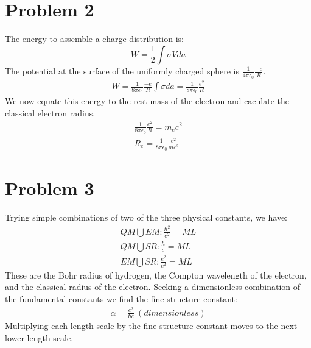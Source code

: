 \documentclass[a4paper,10pt]{article}
\numberwithin{equation}{section}
\begin{document}
\section{Problem 2}
The energy to assemble a charge distribution is:
\begin{equation}
 W=\frac{1}{2} \int \sigma V da
\end{equation}
The potential at the surface of the uniformly charged sphere is $\frac{1}{4\pi \epsilon_0}\frac{-e}{R}$.
\begin{gather}
 W=\frac{1}{8\pi \epsilon_0}\frac{-e}{R}\int \sigma da= \frac{1}{8\pi \epsilon_0}\frac{e^2}{R}
\end{gather}
We now equate this energy to the rest mass of the electron and caculate the classical electron radius.
\begin{gather}
  \frac{1}{8\pi \epsilon_0}\frac{e^2}{R}=m_ec^2\\
  R_e=\frac{1}{8\pi \epsilon_0}\frac{e^2}{mc^2}
\end{gather}

\section{Problem 3}
Trying simple combinations of two of the three physical constants, we have:
\begin{gather}
 QM \bigcup EM: \frac{\hbar ^2}{e^2}=ML\\
 QM \bigcup SR: \frac{\hbar}{c}=ML\\
 EM \bigcup SR: \frac{e^2}{c^2}=ML
\end{gather}
These are the Bohr radius of hydrogen, the Compton wavelength of the electron, and the classical radius of the electron. 
Seeking a dimensionless combination of the fundamental constants we find the fine structure constant:
\begin{gather}
 \alpha = \frac{e^2}{\hbar c} \ (dimensionless)
\end{gather}
Multiplying each length scale by the fine structure constant moves to the next lower length scale.
\end{document}
